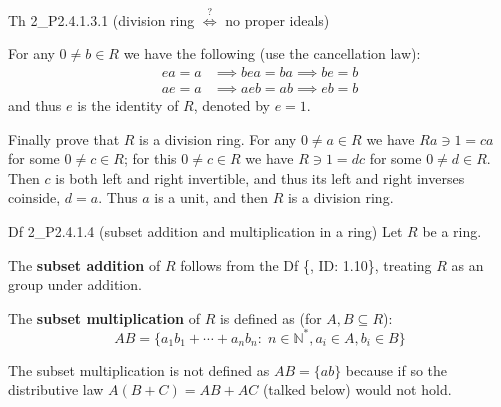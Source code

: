 \documentclass{article}
\begin{document}
\begin{Th}{Th 2\_P2.4.1.3.1 (division ring $\overset{?}{\Longleftrightarrow}$ no proper ideals)}
\begin{compactenum}
\begin{compactitem}
            \item For any $0\neq b\in R$ we have the following (use the cancellation law):
            $$ \begin{aligned}
                ea = a &\implies bea = ba \implies be = b \\
                ae = a &\implies aeb = ab \implies eb = b 
            \end{aligned} $$
            and thus $e$ is the identity of $R$, denoted by $e=1$.
            \item Finally prove that $R$ is a division ring. For any $0\neq a\in R$ we have $Ra\ni 1 = ca$ for some $0\neq c\in R$; for this $0\neq c\in R$ we have $R\ni 1 = dc$ for some $0\neq d\in R$. Then $c$ is both left and right invertible, and thus its left and right inverses coinside, $d=a$. Thus $a$ is a unit, and then $R$ is a division ring.
        \end{compactitem}
    \end{compactenum}
\end{Th}

\begin{Df}{Df 2\_P2.4.1.4 (subset addition and multiplication in a ring)}
    Let $R$ be a ring. 
    \begin{compactenum}
        \item The \textbf{subset addition} of $R$ follows from the Df \{, ID: 1.10\}, treating $R$ as an group under addition.
        \item The \textbf{subset multiplication} of $R$ is defined as (for $A, B\subseteq R$):
        $$ AB = \{a_1b_1 + \cdots + a_nb_n:\; n\in\mathbb{N}^\ast, a_i\in A, b_i\in B\} $$
    \end{compactenum}
\end{Df}

\begin{Rmk}{}
    \textcolor{Th}{The subset multiplication is not defined as $AB = \{ab\}$ because if so the distributive law $A(B+C) = AB + AC$ (talked below) would not hold.}
\end{Rmk}
\end{document}

